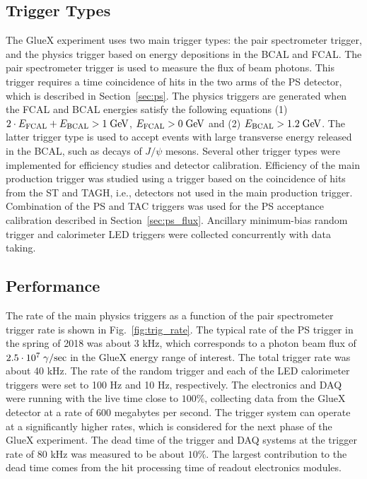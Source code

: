 \subsection{Trigger Types \label{sec:triggers}}

The GlueX experiment uses two main trigger types: the pair spectrometer trigger, and the physics trigger based on energy depositions in the BCAL and FCAL. The 
pair spectrometer trigger is used to measure the flux of beam photons. This trigger requires a time coincidence of hits in the 
two arms of the PS detector, which is described in Section~\ref{sec:ps}. The physics triggers are generated when the FCAL and BCAL energies  satisfy the following equations (1) $2\cdot E_{\rm FCAL} + E_{\rm BCAL} > 1\;{\rm GeV}$,  $E_{\rm FCAL} > 0\; {\rm GeV}$ and (2) $E_{\rm BCAL} > 1.2\;{\rm GeV}$. The latter trigger type is used to accept events with large transverse energy released in the BCAL, such as decays of $J/\psi$ mesons. Several other trigger types were implemented for efficiency studies and detector calibration. 
Efficiency of the main production trigger was studied using a trigger based on the coincidence of hits from the ST and TAGH, i.e., detectors not used in the main production trigger. Combination of the PS and TAC triggers was used for the PS acceptance calibration described in Section~\ref{sec:ps_flux}. Ancillary minimum-bias random trigger and calorimeter LED triggers were collected concurrently with data taking.

\subsection{Performance \label{sec:trigperformance}}
The rate of the main physics triggers as a function of the pair 
spectrometer trigger rate is shown in Fig.~\ref{fig:trig_rate}.
The typical rate of the PS trigger in the spring of 2018 was about 3 kHz, which corresponds to a photon beam flux of $2.5\cdot 10^7\; \gamma/{\rm sec}$ in the GlueX energy range of interest. The total trigger rate was about 40 kHz. The rate of the random trigger and each of the LED calorimeter triggers were set to 100 Hz and 10 Hz, respectively. The electronics and DAQ were running with the live time close to 
$100 \%$, collecting data from the GlueX detector at a rate of 600 megabytes per second.
The trigger system can operate at a significantly higher rates, which is considered for the next phase
of the GlueX experiment. The dead time of the trigger and DAQ systems at the trigger rate of 80 kHz
was measured to be about $10 \%$. The largest contribution to the dead time comes from the hit processing
time of readout electronics modules. 

